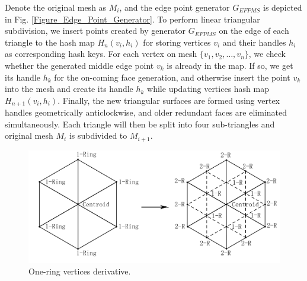 \documentclass[10pt, conference, compsocconf]{IEEEtran}
\begin{document}
Denote the original mesh as $M_i$, and the edge point generator $G_{EFPMS}$ is depicted in Fig. \ref{Figure_Edge_Point_Generator}. To perform linear triangular subdivision, we insert points created by generator $G_{EFPMS}$ on the edge of each triangle to the hash map $H_n(v_i,h_i)$ for storing vertices $v_i$ and their handles $h_i$ as corresponding hash keys. For each vertex on mesh $\{v_1,v_2,\ldots,v_n\}$, we check whether the generated middle edge point $v_k$ is already in the map. If so, we get its handle $h_k$ for the on-coming face generation, and otherwise insert the point $v_k$ into the mesh and create its handle $h_k$ while updating vertices hash map $H_{n+1}(v_i,h_i)$. Finally, the new triangular surfaces are formed using vertex handles geometrically anticlockwise, and  older redundant faces are eliminated simultaneously. Each triangle will then be split into four sub-triangles and original mesh $M_i$ is subdivided to $M_{i+1}$. %



\begin{figure}[!htb]
  \centering
  \includegraphics[width=0.9\linewidth]{./Figure/OneRingVerticesDerivative.png}
  \caption{One-ring vertices derivative.}\label{Figure_OneRing_Vertices_Derivative}
\end{figure}
\end{document}
